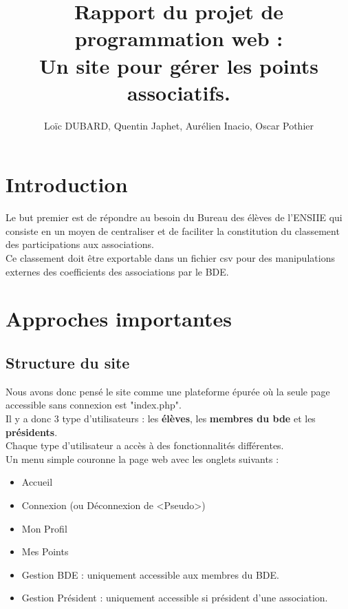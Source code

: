 \documentclass[french]{article}
\author{Loïc DUBARD, Quentin Japhet, Aurélien Inacio, Oscar Pothier}
\title{Rapport du projet de programmation web : \\
\textbf{Un site pour gérer les points associatifs}.}
\begin{document}
\maketitle
\tableofcontents
\clearpage
\section*{Introduction}
Le but premier est de répondre au besoin du Bureau des élèves de l'ENSIIE qui consiste en un moyen de centraliser et de faciliter la constitution du classement des participations aux associations.\\

 Ce classement doit être exportable dans un fichier csv pour des manipulations externes des coefficients des associations par le BDE.\\
 
 \clearpage
 
\section{Approches importantes}
\subsection{Structure du site}
Nous avons donc pensé le site comme une plateforme épurée où la seule page accessible sans connexion est "index.php".\\
 Il y a donc 3 type d'utilisateurs : les \textbf{élèves}, les \textbf{membres du bde} et les \textbf{présidents}.\\ Chaque type d'utilisateur a accès à des fonctionnalités différentes.\\ 
 
 Un menu simple couronne la page web avec les onglets suivants : 
 \begin{itemize}
 	\item Accueil
 	\item Connexion (ou Déconnexion de <Pseudo>) 
 	\item Mon Profil
 	\item Mes Points
 	\item Gestion BDE : uniquement accessible aux membres du BDE.
 	\item Gestion Président : uniquement accessible si président d'une association.
 \end{itemize}
 
\end{document}
